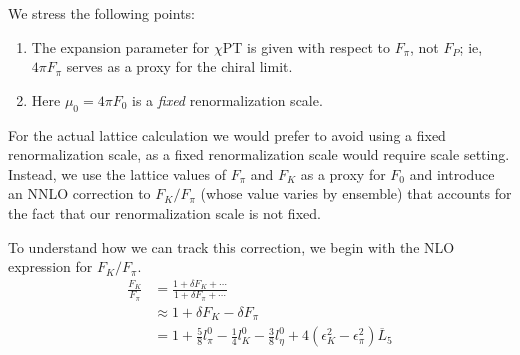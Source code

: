 \documentclass[prd,tightenlines,preprintnumbers,showpacs,superscriptaddress,notitlepage,eqsecnum,floatfix,notitlepage]{revtex4-1}
\begin{document}
We stress the following points:
\begin{enumerate}
	\item The expansion parameter for $\chi$PT is given with respect to $F_\pi$, not $F_P$; ie,  $4 \pi F_\pi$ serves as a proxy for the chiral limit.
	\item Here $\mu_0 = 4 \pi F_0$ is a \emph{fixed} renormalization scale.
\end{enumerate}

For the actual  lattice calculation we would prefer to avoid using a fixed renormalization scale, as a fixed renormalization scale would require scale setting. Instead, we use the lattice values of $F_\pi$ and $F_K$ as a proxy for $F_0$ and introduce an NNLO correction to $F_K/F_\pi$ (whose value varies by ensemble) that accounts for the fact that our renormalization scale is not fixed. 

To understand how we can track this correction, we begin with the NLO expression for $F_K/F_\pi$.
\begin{align}
\frac{F_K}{F_\pi} &= \frac{1 + \delta F_K + \cdots}{1 + \delta F_\pi	 + \cdots} \nonumber \\
&\approx 1 + \delta F_K - \delta F_\pi \nonumber \\
&= 1 + \frac58 l^0_\pi - \frac14 l^0_K - \frac38 l^0_\eta +  4 \left( \epsilon^2_K - \epsilon^2_\pi 
\right) \overline L_5
\end{align}

\newpage
\end{document}
